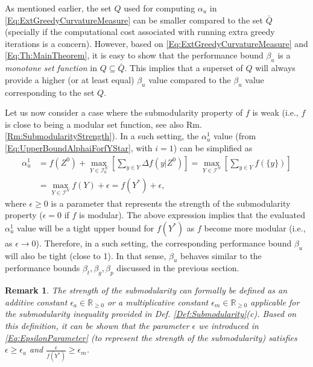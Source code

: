 \documentclass[conference]{IEEEtran}
\newcommand{\R}{\mathbb{R}}
\newtheorem{remark}{Remark}
\begin{document}
As mentioned earlier, the set $Q$ used for computing $\alpha_u$ in \eqref{Eq:ExtGreedyCurvatureMeasure} can be smaller compared to the set $\bar{Q}$ (specially if the computational cost associated with running extra greedy iterations is a concern). However, based on \eqref{Eq:ExtGreedyCurvatureMeasure} and \eqref{Eq:Th:MainTheorem}, it is easy to show that the performance bound $\beta_u$ is a \emph{monotone set function} in $Q \subseteq \bar{Q}$. This implies that a superset of $Q$ will always provide a higher (or at least equal) $\beta_u$ value compared to the $\beta_u$ value corresponding to the set $Q$.



Let us now consider a case where the submodularity property of $f$ is weak (i.e., $f$ is close to being a modular set function, see also Rm. \ref{Rm:SubmodularityStrength}). In a such setting, the $\alpha^1_u$ value (from \eqref{Eq:UpperBoundAlphaiForfYStar}, with $i=1$) can be simplified as
\begin{align}
    \alpha_u^1 
    &= f(Z^0)+\underset{Y\in\mathcal{I}^N_0}{\max}\left[\sum_{y\in Y}\Delta f(y\vert Z^0)\right] 
    = \underset{Y \in \mathcal{I}^N}{\max} \left[\sum_{y\in Y} f(\{y\}) \right]\nonumber \\\label{Eq:EpsilonParameter}
    &= \underset{Y \in \mathcal{I}^N}{\max} f(Y) + \epsilon = f(Y^*) + \epsilon, 
\end{align}
where $\epsilon\geq0$ is a parameter that represents the strength of the submodularity property ($\epsilon = 0$ if $f$ is modular). The above expression implies that the evaluated $\alpha_u^1$ value will be a tight upper bound for $f(Y^*)$ as $f$ become more modular (i.e., as $\epsilon\rightarrow 0$). Therefore, in a such setting, the corresponding performance bound $\beta_u$ will also be tight (close to 1). In that sense, $\beta_u$ behaves similar to the performance bounds $\beta_t,\beta_g,\beta_p$ discussed in the previous section. 


\begin{remark}
The strength of the submodularity can formally be defined as an additive constant $\epsilon_a\in\R_{\geq 0}$ or a multiplicative constant $\epsilon_m \in \R_{\geq 0}$ applicable for the submodularity inequality provided in Def. \ref{Def:Submodularity}(c). Based on this definition, it can be shown that the parameter $\epsilon$ we introduced in  \eqref{Eq:EpsilonParameter} (to represent the strength of the submodularity) satisfies $\epsilon \geq \epsilon_a$ and $\frac{\epsilon}{f(Y^*)} \geq \epsilon_m$. 
\end{remark}
\end{document}
